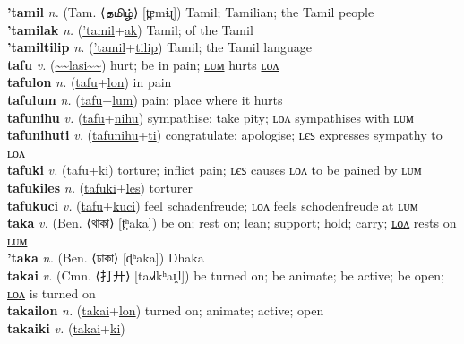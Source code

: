 \textbf{'tamil} \textit{n.} (Tam. ⟨தமிழ்⟩ [t̪ɐmɨɻ])
Tamil; Tamilian; the Tamil people \label{'tamil} \\
\textbf{'tamilak} \textit{n.} (\hyperref['tamil]{'tamil}+\hyperref[ak]{ak})
Tamil; of the Tamil \label{'tamilak} \\
\textbf{'tamiltilip} \textit{n.} (\hyperref['tamil]{'tamil}+\hyperref[tilip]{tilip})
Tamil; the Tamil language \label{'tamiltilip} \\
\textbf{tafu} \textit{v.} (\hyperref[lasi]{\~{}\~{}lasi\~{}\~{}})
hurt; be in pain; \hyperref[tafulum]{ʟᴜᴍ} hurts \hyperref[tafulon]{ʟᴏᴧ} \label{tafu} \\
\textbf{tafulon} \textit{n.} (\hyperref[tafu]{tafu}+\hyperref[lon]{lon})
in pain \label{tafulon} \\
\textbf{tafulum} \textit{n.} (\hyperref[tafu]{tafu}+\hyperref[lum]{lum})
pain; place where it hurts \label{tafulum} \\
\textbf{tafunihu} \textit{v.} (\hyperref[tafu]{tafu}+\hyperref[nihu]{nihu})
sympathise; take pity; ʟᴏᴧ sympathises with ʟᴜᴍ \label{tafunihu} \\
\textbf{tafunihuti} \textit{v.} (\hyperref[tafunihu]{tafunihu}+\hyperref[ti]{ti})
congratulate; apologise; ʟєꜱ expresses sympathy to ʟᴏᴧ \label{tafunihuti} \\
\textbf{tafuki} \textit{v.} (\hyperref[tafu]{tafu}+\hyperref[ki]{ki})
torture; inflict pain; \hyperref[tafukiles]{ʟєꜱ} causes ʟᴏᴧ to be pained by ʟᴜᴍ \label{tafuki} \\
\textbf{tafukiles} \textit{n.} (\hyperref[tafuki]{tafuki}+\hyperref[les]{les})
torturer \label{tafukiles} \\
\textbf{tafukuci} \textit{v.} (\hyperref[tafu]{tafu}+\hyperref[kuci]{kuci})
feel schadenfreude; ʟᴏᴧ feels schodenfreude at ʟᴜᴍ \label{tafukuci} \\
\textbf{taka} \textit{v.} (Ben. ⟨থাকা⟩ [t̪ʰaka])
be on; rest on; lean; support; hold; carry; \hyperref[takalon]{ʟᴏᴧ} rests on \hyperref[takalum]{ʟᴜᴍ} \label{taka} \\
\textbf{'taka} \textit{n.} (Ben. ⟨ঢাকা⟩ [ɖʱaka])
Dhaka \label{'taka} \\
\textbf{takai} \textit{v.} (Cmn. ⟨打开⟩ [ta˧˩˧kʰaɪ̯˥])
be turned on; be animate; be active; be open; \hyperref[takailon]{ʟᴏᴧ} is turned on \label{takai} \\
\textbf{takailon} \textit{n.} (\hyperref[takai]{takai}+\hyperref[lon]{lon})
turned on; animate; active; open \label{takailon} \\
\textbf{takaiki} \textit{v.} (\hyperref[takai]{takai}+\hyperref[ki]{ki})
